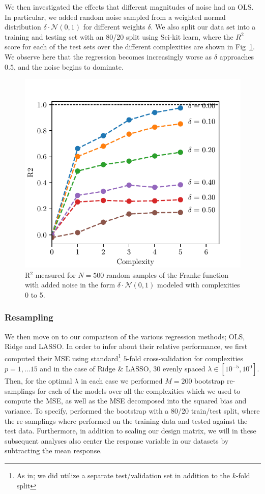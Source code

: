 \documentclass[reprint, english, nofootinbib]{revtex4-2}
\begin{document}
We then investigated the effects that different magnitudes of noise had on OLS. In particular, we added random noise sampled from a weighted normal distribution $\delta \cdot \mathcal N(0, 1)$ for different weights $\delta$. We also split our data set into a training and testing set with an 80/20 split using Sci-kit learn, where the $R^2$ score for each of the test sets over the different complexities are shown in Fig~\ref{fig:r2_vs_noise}.
We observe here that the regression becomes increasingly worse as $\delta$ approaches $0.5$, and the noise begins to dominate.

\begin{figure}[h!tb]
    \center
    \includegraphics[width=.8\columnwidth]{OLS_R2_noise.pdf}
    \caption{R$^2$ measured for $N=500$ random samples of the Franke function with added noise in the form $\delta\cdot\mathcal N(0, 1)$ modeled with complexities 0 to 5.}
    \label{fig:r2_vs_noise}
\end{figure}


\subsubsection{Resampling}
\noindent
We then move on to our comparison of the various regression methods; OLS, Ridge and LASSO. In order to infer about their relative performance, we first computed their MSE using standard\footnote{As in; we did utilize a separate test/validation set in addition to the $k$-fold split} $5$-fold cross-validation for complexities $p=1, \dots 15$ and in the case of Ridge \& LASSO, 30 evenly spaced $\lambda \in [10^{-5}, 10^{0}]$. Then, for the optimal $\lambda$ in each case we performed $M=200$ bootstrap re-samplings for each of the models over all the complexities which we used to compute the MSE, as well as the MSE decomposed into the squared bias and variance. To specify, performed the bootstrap with a 80/20 train/test split, where the re-samplings where performed on the training data and tested against the test data.
Furthermore, in addition to scaling our design matrix, we will in these subsequent analyses also center the response variable in our datasets by subtracting the mean response.
\end{document}
